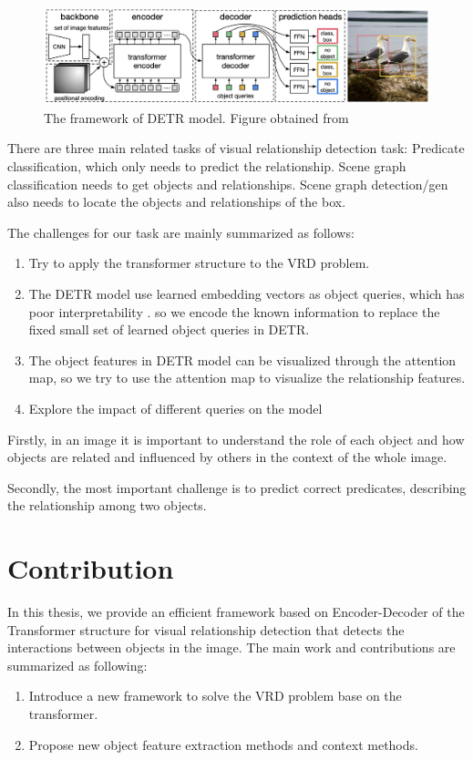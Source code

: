 \begin{figure}[!htbp]
	\centering
	\includegraphics[width = 1 \textwidth]{figures/DETR.png}
	\caption[The framework of DETR model]
	{ The framework of DETR model. Figure obtained from ~\cite{carion2020end}}
	\label{fig:detr}
\end{figure}


There are three main related tasks of visual relationship detection task: Predicate classification, which only needs to predict the relationship. Scene graph classification needs to get objects and relationships. Scene graph detection/gen also needs to locate the objects and relationships of the box.

The challenges for our task are mainly summarized as follows:

\begin{enumerate}[\qquad  1.]
	\item Try to apply the transformer structure to the VRD problem.
	\item The DETR model use learned embedding vectors as object queries, which has poor interpretability . so we encode the known information to replace the fixed small set of learned object queries in DETR.
	\item  The object features in DETR model can be visualized through the attention map, so we try to use the attention map to visualize the relationship features.
	\item  Explore the impact of different queries on the model 
\end{enumerate}

Firstly,  in an image it is important to understand the role of each object and how objects are related and influenced by others in the context of the whole image.

Secondly, the most important challenge is to predict correct predicates, describing the relationship among two objects. 
 

\section{Contribution}

In this thesis, we provide  an efficient framework based on Encoder-Decoder of the  Transformer structure  for visual relationship detection that detects the interactions between objects in the image. The main work and contributions are summarized as following:
\begin{enumerate}[\qquad  1.]
	\item Introduce a new framework to solve the VRD problem base on the transformer.
	\item Propose new object feature extraction methods and context methods.
\end{enumerate}


